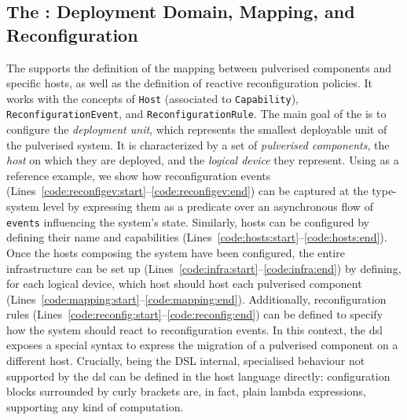 \documentclass[conference]{IEEEtran}
\newcommand{\meta}[1]{{\color{blue}#1}}
\begin{document}
\subsection{The \dslDep{}: Deployment Domain, Mapping, and Reconfiguration}
\label{sec:contrib:dsldep}

The \dslDep{} supports the definition of the mapping between pulverised components and specific hosts,
as well as the definition of reactive reconfiguration policies.
%
It works with the concepts of \texttt{Host}
(associated to \texttt{Capability}),
\texttt{ReconfigurationEvent},
and \texttt{ReconfigurationRule}.
%
\meta{
The main goal of the \dslDep{} is to configure the \emph{deployment unit},
which represents the smallest deployable unit of the pulverised system.
%
It is characterized by a set of \emph{pulverised components},
the \emph{host} on which they are deployed,
and the \emph{logical device} they represent. 
}
%
Using  as a reference example,
we show how reconfiguration events (Lines~\ref{code:reconfigev:start}--\ref{code:reconfigev:end}) can be captured at the type-system level
by expressing them as a predicate over an asynchronous flow of \texttt{events} influencing the system's state.
%
Similarly, hosts can be configured by defining their name and capabilities (Lines~\ref{code:hosts:start}--\ref{code:hosts:end}).
%
Once the hosts composing the system have been configured,
the entire infrastructure can be set up (Lines~\ref{code:infra:start}--\ref{code:infra:end}) by defining,
for each logical device,
which host should host each pulverised component (Lines~\ref{code:mapping:start}--\ref{code:mapping:end}).
%
Additionally,
reconfiguration rules (Lines~\ref{code:reconfig:start}--\ref{code:reconfig:end}) can be defined to specify how the system should react to reconfiguration events.
%
In this context, the \ac{dsl} exposes a special syntax to express the migration of a pulverised component on a different host.
%
Crucially, being the DSL internal,
specialised behaviour not supported by the \ac{dsl} can be defined in the host language directly:
configuration blocks surrounded by curly brackets are,
in fact,
plain lambda expressions, supporting any kind of computation.

\makeatletter
\newcommand\currentStyle@lstparam{}
\lst@AddToHook{Output}{\global\let\currentStyle@lstparam\lst@thestyle}
\lst@AddToHook{OutputOther}{\global\let\currentStyle@lstparam\lst@thestyle}
\makeatother

\makeatletter
\newcommand{\crefe}[1]{\currentStyle@lstparam\Cref{#1}} %
\makeatother
\end{document}
